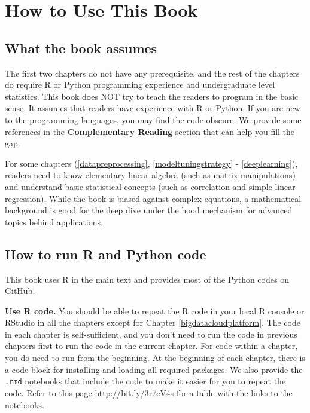 \documentclass[12pt,]{krantz}
\begin{document}
\hypertarget{how-to-use-this-book}{%
\section*{How to Use This Book}\label{how-to-use-this-book}}


\hypertarget{what-the-book-assumes}{%
\subsection*{What the book assumes}\label{what-the-book-assumes}}


The first two chapters do not have any prerequisite, and the rest of the chapters do require R or Python programming experience and undergraduate level statistics. This book does NOT try to teach the readers to program in the basic sense. It assumes that readers have experience with R or Python.
If you are new to the programming languages, you may find the code obscure. We provide some references in the \textbf{Complementary Reading} section that can help you fill the gap.

For some chapters (\ref{datapreprocessing}, \ref{modeltuningstrategy} - \ref{deeplearning}), readers need to know elementary linear algebra (such as matrix manipulations) and understand basic statistical concepts (such as correlation and simple linear regression). While the book is biased against complex equations, a mathematical background is good for the deep dive under the hood mechanism for advanced topics behind applications.

\hypertarget{how-to-run-r-and-python-code}{%
\subsection*{How to run R and Python code}\label{how-to-run-r-and-python-code}}


This book uses R in the main text and provides most of the Python codes on GitHub.

\textbf{Use R code.} You should be able to repeat the R code in your local R console or RStudio in all the chapters except for Chapter \ref{bigdatacloudplatform}. The code in each chapter is self-sufficient, and you don't need to run the code in previous chapters first to run the code in the current chapter. For code within a chapter, you do need to run from the beginning. At the beginning of each chapter, there is a code block for installing and loading all required packages. We also provide the \texttt{.rmd} notebooks that include the code to make it easier for you to repeat the code. Refer to this page \url{http://bit.ly/3r7cV4s} for a table with the links to the notebooks.
\end{document}
